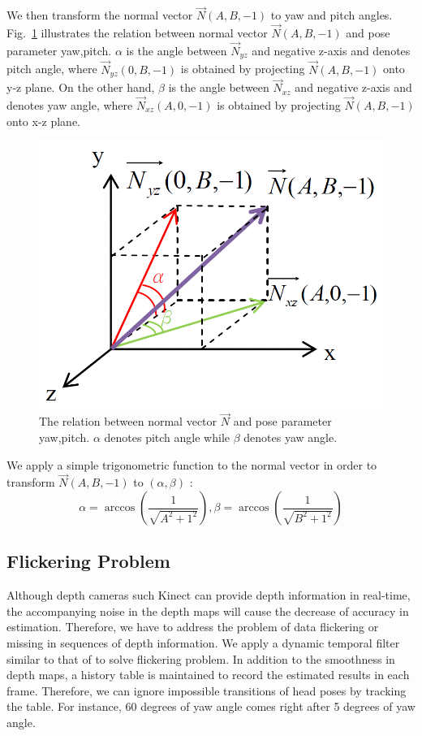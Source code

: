 We then transform the normal vector $\vec{N}(A,B,-1)$ to yaw and pitch angles. Fig.~\ref{fig:11} illustrates the relation between normal vector $\vec{N}(A,B,-1)$ and pose parameter {yaw,pitch}. $\alpha$ is the angle between $\vec{N}_{yz}$ and negative z-axis and denotes pitch angle, where $\vec{N}_{yz}(0,B,-1)$ is obtained by projecting $\vec{N}(A,B,-1)$ onto y-z plane. On the other hand, $\beta$ is the angle between $\vec{N}_{xz}$ and negative z-axis and denotes yaw angle, where $\vec{N}_{xz}(A,0,-1)$ is obtained by projecting $\vec{N}(A,B,-1)$ onto x-z plane.

\begin{figure}
\centering
\includegraphics[width=0.7\linewidth]{./fig11.png}
\caption{The relation between normal vector $\vec{N}$ and pose parameter {yaw,pitch}. $\alpha$ denotes pitch angle while $\beta$ denotes yaw angle.}
\label{fig:11}       %
\end{figure}

We apply a simple trigonometric function to the normal vector in order to transform $\vec{N}(A,B,-1)$ to $(\alpha,\beta )$ :
\begin{equation}
\alpha = \arccos{(\frac{1}{\sqrt{A^2+1^2}})},
\beta  = \arccos{(\frac{1}{\sqrt{B^2+1^2}})}
\end{equation}

\subsection{Flickering Problem}
\label{sec:3.4}
Although depth cameras such Kinect can provide depth information in real-time, the accompanying noise in the depth maps will cause the decrease of accuracy in estimation. Therefore, we have to address the problem of data flickering or missing in sequences of depth information. We apply a dynamic temporal filter similar to that of \cite{Ref19} to solve flickering problem. In addition to the smoothness in depth maps, a history table is maintained to record the estimated results in each frame. Therefore, we can ignore impossible transitions of head poses by tracking the table. For instance, 60 degrees of yaw angle comes right after 5 degrees of yaw angle. 
